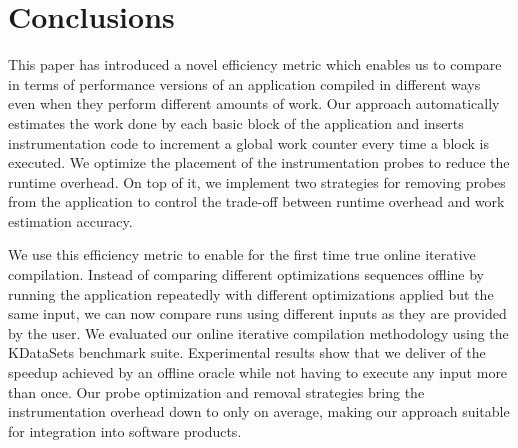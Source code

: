 \section{Conclusions}
This paper has introduced a novel efficiency metric which enables us to compare in terms of performance versions of an application compiled
in different ways even when they perform different amounts of work. Our approach automatically estimates the work done by each basic block
of the application and inserts instrumentation code to increment a global work counter every time a block is executed. We optimize the
placement of the instrumentation probes to reduce the runtime overhead. On top of it, we implement two strategies for removing probes from
the application to control the trade-off between runtime overhead and work estimation accuracy.

We use this efficiency metric to enable for the first time true online iterative compilation. Instead of comparing different optimizations
sequences offline by running the application repeatedly with different optimizations applied but the same input, we can now compare runs
using different inputs as they are provided by the user. We evaluated our online iterative compilation methodology using the KDataSets
benchmark suite. Experimental results show that we deliver  of the speedup achieved by an offline oracle while not having to
execute any input more than once. Our probe optimization and removal strategies bring the instrumentation overhead down to only 
on average, making our approach suitable for integration into software products.






